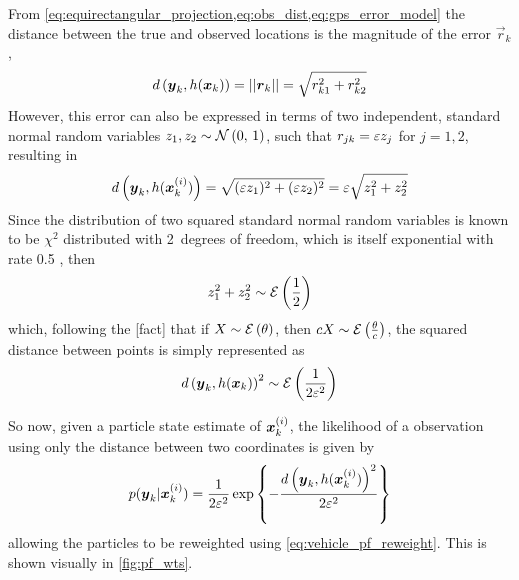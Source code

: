 From \cref{eq:equirectangular_projection,eq:obs_dist,eq:gps_error_model}
the distance between the true and observed locations
is the magnitude of the error $\vec{r}_k$,
\begin{equation}
d\left(\boldsymbol{y}_k, h(\boldsymbol x_k)\right) = ||\boldsymbol{r}_k|| =
    \sqrt{r_{k1}^2 + r_{k2}^2}
\end{equation}
However, this error can also be expressed in terms of two independent,
standard normal random variables $z_1, z_2 \sim \mathcal{N}\left(0,\, 1\right)$,
such that $r_{jk} = \varepsilon z_j$ for $j = 1, 2$,
resulting in
\begin{equation}
d\left(\boldsymbol{y}_k, h(\boldsymbol x^{(i)}_k)\right) =
    \sqrt{(\varepsilon z_1)^2 + (\varepsilon z_2)^2} =
    \varepsilon \sqrt{z_1^2 + z_2^2}
\end{equation}
Since the distribution of two squared standard normal random variables is known
to be $\chi^2$ distributed with 2~degrees of freedom,
which is itself exponential with rate 0.5
\citep{cn},
then
\begin{equation}
\label{eq:sum_sq_dist}
z_1^2 + z_2^2 \sim \mathcal{E}\left(\frac{1}{2}\right)
\end{equation}
which, following the [fact] that if $X \sim \mathcal{E}\left(\theta\right)$,
then $cX \sim \mathcal{E}\left(\frac{\theta}{c}\right)$,
the squared distance between points is simply represented as
\begin{equation}
\label{eq:distance_distrib}
d\left(\boldsymbol{y}_k, h(\boldsymbol x_k)\right)^2 \sim \mathcal{E}\left(\frac{1}{2\varepsilon^2}\right)
\end{equation}

So now, given a particle state estimate of $\boldsymbol x^{(i)}_k$,
the likelihood of a \GPS{} observation using only
the distance between two coordinates is given by
\begin{equation}
\label{eq:particle_lh_fun}
p(\boldsymbol{y}_k | \boldsymbol x^{(i)}_k) =
    \frac{1}{2\varepsilon^2} \exp\left\{
        - \frac{d\left(\boldsymbol{y}_k, h(\boldsymbol x^{(i)}_k)\right)^2}{2\varepsilon^2}
    \right\}
\end{equation}
allowing the particles to be reweighted using \cref{eq:vehicle_pf_reweight}.
This is shown visually in \cref{fig:pf_wts}.


